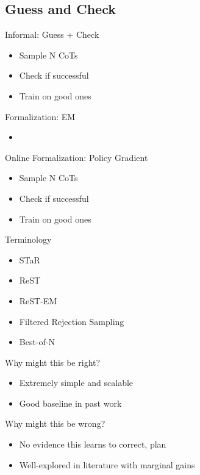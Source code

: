 \documentclass[14pt,aspectratio=169]{beamer}
\begin{document}
\subsection{Guess and Check}

\begin{frame}{Informal: Guess + Check}
	\begin{itemize}
		\item Sample N CoTs
		\item Check if successful
		\item Train on good ones
	\end{itemize}
\end{frame}

\begin{frame}{Formalization: EM}
	\begin{itemize}
		\item
	\end{itemize}
\end{frame}


\begin{frame}{Online Formalization: Policy Gradient}
	\begin{itemize}
		\item Sample N CoTs
		\item Check if successful
		\item Train on good ones
	\end{itemize}
\end{frame}


\begin{frame}{Terminology}
	\begin{itemize}
		\item STaR
		\item ReST
		\item ReST-EM
		\item Filtered Rejection Sampling
		\item Best-of-N
	\end{itemize}
\end{frame}


\begin{frame}{Why might this be right?}
	\begin{itemize}
		\item Extremely simple and scalable
		\item Good baseline in past work
	\end{itemize}
\end{frame}

\begin{frame}{Why might this be wrong?}
	\begin{itemize}
		\item No evidence this learns to correct, plan
		\item Well-explored in literature with marginal gains
	\end{itemize}
\end{frame}
\end{document}
